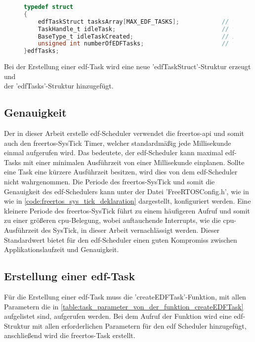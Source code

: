 \documentclass[../EDF Master Thesis.tex]{subfiles}
\begin{document}
\begin{figure}[H]
\begin{lstlisting}[language=C, caption=edfTasks Struktur, label=code:edfTasks]
typedef struct
{
    edfTaskStruct tasksArray[MAX_EDF_TASKS];            // tasks array
    TaskHandle_t idleTask;                              // taskhandle idle task
    BaseType_t idleTaskCreated;                         // idle task created?
    unsigned int numberOfEDFTasks;                      // total number of tasks
}edfTasks;
\end{lstlisting}
\end{figure}

Bei der Erstellung einer \ac{edf}-Task wird eine neue 'edfTaskStruct'-Struktur erzeugt und \\der 'edfTasks'-Struktur hinzugefügt.

\subsection{Genauigkeit} \label{section:genauigkeit}

Der in dieser Arbeit erstelle \ac{edf}-Scheduler verwendet die \ac{freertos}-\ac{api} und somit auch den \ac{freertos}-SysTick Timer, welcher standardmäßig jede Millisekunde einmal aufgerufen wird.
Das bedeutete, der \ac{edf}-Scheduler kann maximal \ac{edf}-Tasks mit einer minimalen Ausführzeit von einer Millisekunde einplanen.
Sollte eine Task eine kürzere Ausführzeit besitzen, wird dies von dem \ac{edf}-Scheduler nicht wahrgenommen.
Die Periode des \ac{freertos}-SysTick und somit die Genauigkeit des \ac{edf}-Schedulers kann unter der Datei 'FreeRTOSConfig.h', wie in wie in \autoref{code:freertos_sys_tick_deklaration} dargestellt, konfiguriert werden.
Eine kleinere Periode des \ac{freertos}-SysTick führt zu einem häufigeren Aufruf und somit zu einer größeren \ac{cpu}-Belegung, wobei auftauchende Interrupts, wie die \ac{cpu}-Ausführzeit des SysTick, in dieser Arbeit vernachlässigt werden.
Dieser Standardwert bietet für den \ac{edf}-Scheduler einen guten Kompromiss zwischen Applikationslaufzeit und Genauigkeit.

\clearpage
\subsection{Erstellung einer \acf{edf}-Task} \label{section:erstellung_einer_edf_task}

    Für die Erstellung einer \ac{edf}-Task muss die 'createEDFTask'-Funktion, mit allen Parametern die in \autoref{table:task_parameter_von_der_funktion_createEDFTask} aufgelistet sind, aufgerufen werden.
    Bei dem Aufruf der Funktion wird eine \ac{edf}-Struktur mit allen erforderlichen Parametern für den \ac{edf} Scheduler hinzugefügt, anschließend wird die \ac{freertos}-Task erstellt.
\end{document}
